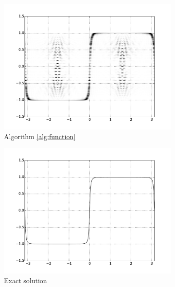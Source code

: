 \documentclass[final,leqno]{siamltex1213}
\begin{document}
\begin{figure}[h]
	\centering
	\begin{subfigure}{0.3\textwidth}
		\includegraphics[width=\textwidth]{./images/function_plots/quantum_1.pdf}
		\caption{Algorithm \ref{alg:function}}
		\label{fig:quantum function 1}
	\end{subfigure}
	\begin{subfigure}{0.3\textwidth}
		\includegraphics[width=\textwidth]{./images/function_plots/exact_1.pdf}
		\caption{Exact solution}
		\label{fig:exact function 1}
	\end{subfigure}
	\begin{subfigure}{0.3\textwidth}

\end{subfigure}
\end{figure}
\end{document}
